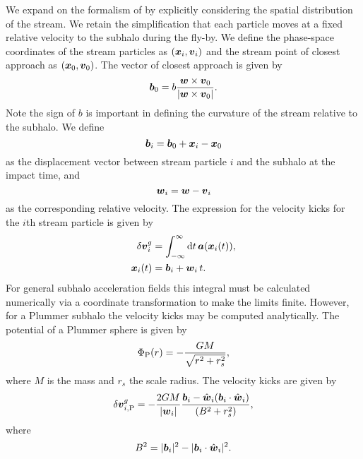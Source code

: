 \documentclass[useAMS,usenatbib,fleqn,a4paper]{mn2e}
\def\d{{\rm d}}
\newcommand{\bs}[1]{\bmath{#1}}
\begin{document}
We expand on the formalism of \cite{ErkalBelokurov2015} by explicitly considering the spatial distribution of the stream. We retain the simplification that each particle moves at a fixed relative velocity to the subhalo during the fly-by. We define the phase-space coordinates of the stream particles as $(\bs{x}_i,\bs{v}_i)$ and the stream point of closest approach as $(\bs{x}_0,\bs{v}_0)$. The vector of closest approach is given by
\begin{equation}
\bs{b}_0=b\frac{\bs{w}\times\bs{v}_0}{|\bs{w}\times\bs{v}_0|}.
\end{equation}
Note the sign of $b$ is important in defining the curvature of the stream relative to the subhalo. We define
\begin{equation}
\bs{b}_i = \bs{b}_0+\bs{x}_i-\bs{x}_0
\end{equation}
as the displacement vector between stream particle $i$ and the subhalo at the impact time, and
\begin{equation}
\bs{w}_i=\bs{w}-\bs{v}_i
\end{equation}
as the corresponding relative velocity. The expression for the velocity kicks for the $i$th stream particle is given by
\begin{equation}
\begin{split}
\delta\bs{v}^g_i &= \int_{-\infty}^{\infty} \d t\,\bs{a}(\bs{x}_i(t)),\\
\bs{x}_i(t)&=\bs{b}_i+\bs{w}_i\,t.
\end{split}
\end{equation}For general subhalo acceleration fields this integral must be calculated numerically via a coordinate transformation to make the limits finite. However, for a Plummer subhalo the velocity kicks may be computed analytically. The potential of a Plummer sphere is given by
\begin{equation}
\Phi_{\rm P}(r) = -\frac{GM}{\sqrt{r^2+r_s^2}},
\end{equation}
where $M$ is the mass and $r_s$ the scale radius. The velocity kicks are given by
\begin{equation}
\delta\bs{v}^{g}_{i,\mathrm{P}} = -\frac{2GM}{|\bs{w}_i|}
\frac{\bs{b}_i-\hat{\bs{w}}_i(\bs{b}_i\cdot\hat{\bs{w}}_i)}
{(B^2+r_s^2)},
\label{curved}
\end{equation}
where
\begin{equation}
B^2=|\bs{b}_i|^2
-|\bs{b}_i\cdot\hat{\bs{w}}_i|^2.
\end{equation}
\end{document}
